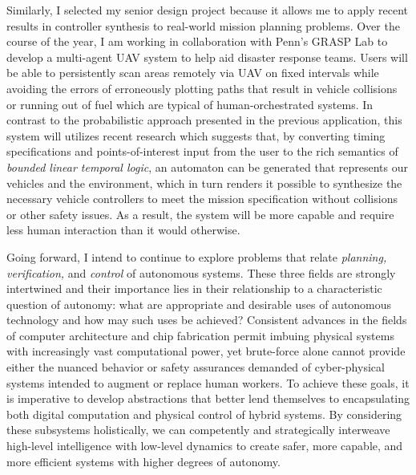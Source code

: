 \documentclass[11pt]{letter}
\begin{document}
Similarly, I selected my senior design project because it allows me to apply recent results in controller synthesis to real-world mission planning problems. Over the course of the year, I am working in collaboration with Penn's GRASP Lab to develop a multi-agent UAV system to help aid disaster response teams. Users will be able to persistently scan areas remotely via UAV on fixed intervals while avoiding the errors of erroneously plotting paths that result in vehicle collisions or running out of fuel which are typical of human-orchestrated systems. In contrast to the probabilistic approach presented in the previous application, this system will utilizes recent research which suggests that, by converting timing specifications and points-of-interest input from the user to the rich semantics of \emph{bounded linear temporal logic}, an automaton can be generated that represents our vehicles and the environment, which in turn renders it possible to synthesize the necessary vehicle controllers to meet the mission specification without collisions or other safety issues.  As a result, the system will be more capable and require less human interaction than it would otherwise.

Going forward, I intend to continue to explore problems that relate \emph{planning, verification,} and \emph{control} of autonomous systems.  These three fields are strongly intertwined and their importance lies in their relationship to a characteristic question of autonomy:  what are appropriate and desirable uses of autonomous technology and how may such uses be achieved? Consistent advances in the fields of computer architecture and chip fabrication permit imbuing physical systems with increasingly vast computational power, yet brute-force alone cannot provide either the nuanced behavior or safety assurances demanded of cyber-physical systems intended to augment or replace human workers. To achieve these goals, it is imperative to develop abstractions that better lend themselves to encapsulating both digital computation and physical control of hybrid systems. By considering these subsystems holistically, we can competently and strategically interweave high-level intelligence with low-level dynamics to create safer, more capable, and more efficient systems with higher degrees of autonomy.  
\end{document}
